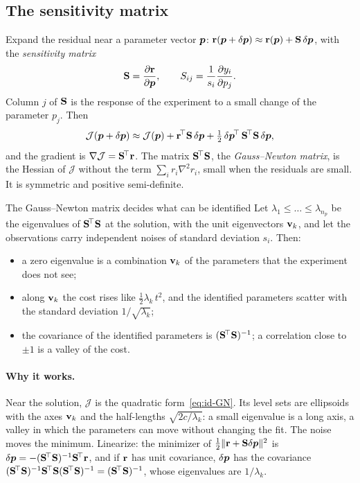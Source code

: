 \subsection{The sensitivity matrix}\label{ssec:id-sens}
%
Expand the residual near a parameter vector $\bm{p}$:
$\mathbf{r}(\bm{p}+\delta\bm{p})\approx\mathbf{r}(\bm{p})+\mathbf{S}\,\delta\bm{p}$, with the
\emph{sensitivity matrix}
\begin{equation}\label{eq:id-S}
  \mathbf{S}=\frac{\partial\mathbf{r}}{\partial\bm{p}},\qquad
  S_{ij}=\frac1{s_i}\frac{\partial y_i}{\partial p_j}.
\end{equation}
Column $j$ of $\mathbf{S}$ is the response of the experiment to a small change of
the parameter $p_j$. Then
\begin{equation}\label{eq:id-GN}
  \mathcal J(\bm{p}+\delta\bm{p})\approx\mathcal J(\bm{p})+\mathbf{r}^{\!\top}\mathbf{S}\,\delta\bm{p}
  +\tfrac12\,\delta\bm{p}^{\!\top}\,\mathbf{S}^{\!\top}\mathbf{S}\,\delta\bm{p} ,
\end{equation}
and the gradient is $\nabla\mathcal J=\mathbf{S}^{\!\top}\mathbf{r}$. The matrix
$\mathbf{S}^{\!\top}\mathbf{S}$, the \emph{Gauss--Newton matrix}, is the Hessian of
$\mathcal J$ without the term $\sum_ir_i\nabla^2r_i$, small when the residuals
are small. It is symmetric and positive semi-definite.

\begin{gbox}{The Gauss--Newton matrix decides what can be identified}\label{prop:id-GN}
Let $\lambda_1\le\dots\le\lambda_{n_p}$ be the eigenvalues of $\mathbf{S}^{\!\top}\mathbf{S}$ at the
solution, with the unit eigenvectors $\mathbf{v}_k$, and let the observations carry
independent noises of standard deviation $s_i$. Then:
\begin{itemize}
  \item a zero eigenvalue is a combination $\mathbf{v}_k$ of the parameters that
  the experiment does not see;
  \item along $\mathbf{v}_k$ the cost rises like $\tfrac12\lambda_k\,t^2$, and the
  identified parameters scatter with the standard deviation $1/\sqrt{\lambda_k}$;
  \item the covariance of the identified parameters is
  $(\mathbf{S}^{\!\top}\mathbf{S})^{-1}$; a correlation close to $\pm1$ is a valley of the cost.
\end{itemize}
\end{gbox}
\paragraph{Why it works.} Near the solution, $\mathcal J$ is the quadratic
form~\eqref{eq:id-GN}. Its level sets are ellipsoids with the axes $\mathbf{v}_k$
and the half-lengths $\sqrt{2c/\lambda_k}$: a small eigenvalue is a long axis,
a valley in which the parameters can move without changing the fit. The noise
moves the minimum. Linearize: the minimizer of
$\tfrac12\lVert \mathbf{r}+\mathbf{S}\delta\bm{p}\rVert^2$ is
$\delta\bm{p}=-(\mathbf{S}^{\!\top}\mathbf{S})^{-1}\mathbf{S}^{\!\top}\mathbf{r}$, and if $\mathbf{r}$ has unit
covariance, $\delta\bm{p}$ has the covariance
$(\mathbf{S}^{\!\top}\mathbf{S})^{-1}\mathbf{S}^{\!\top}\mathbf{S}(\mathbf{S}^{\!\top}\mathbf{S})^{-1}=(\mathbf{S}^{\!\top}\mathbf{S})^{-1}$,
whose eigenvalues are $1/\lambda_k$.

